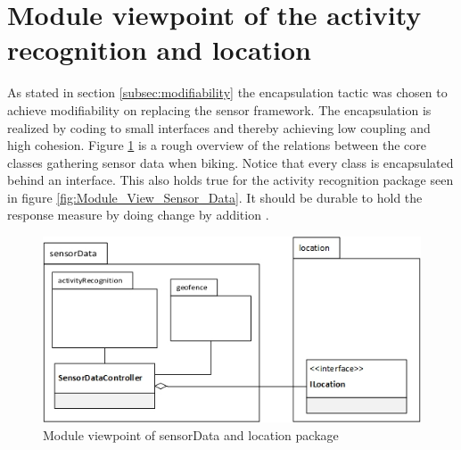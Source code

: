 \section{Module viewpoint of the activity recognition and location}
As stated in section \ref{subsec:modifiability} the encapsulation tactic was chosen to achieve modifiability on replacing the sensor framework. The encapsulation is realized by coding to small interfaces and thereby achieving low coupling and high cohesion. Figure \ref{fig:activity_regonition_module_viewpoint} is a rough overview of the relations between the core classes gathering sensor data when biking.  
Notice that every class is encapsulated behind an interface. This also holds true for the activity recognition package seen in figure \ref{fig:Module_View_Sensor_Data}. It should be durable to hold the response measure by doing change by addition \cite{Baerbak10}.    

\begin{figure}[H]
\centering
\includegraphics[scale=0.6]{ActivityRegonitionModuleViewpoint.jpg}
\caption{Module viewpoint of sensorData and location package}
\label{fig:activity_regonition_module_viewpoint}
\end{figure}